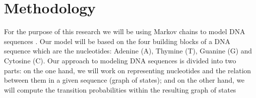 \documentclass[10pt,twocolumn,letterpaper]{article}
\begin{document}
\section{Methodology}
 {
    For the purpose of this research we will be using Markov chains to model DNA sequences \cite{singh}. Our model will be based on the four building blocks of a DNA sequence which are the nucleotides: Adenine (A), Thymine (T),
    Guanine (G) and Cytosine (C).
    Our approach to modeling DNA sequences is divided into two parts: on the one hand, we will work on representing nucleotides and the relation between them in a given sequence (graph of states); and on the other hand, we will compute the transition probabilities within the resulting graph of states
 }



 {\small
  
  
 }
\end{document}
